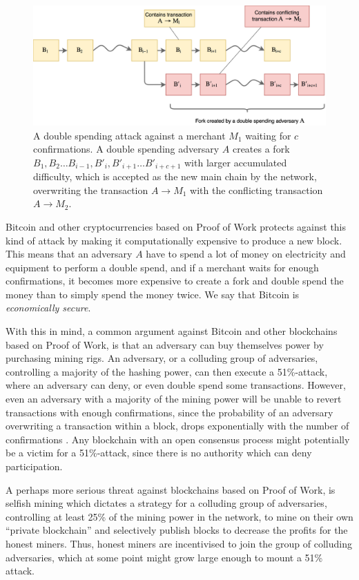 \documentclass{style/kththesis}
\begin{document}
\begin{figure}[ht!]
    \centering
    \includegraphics[width=\textwidth]{figures/double-spend}
    \caption{A double spending attack against a merchant $M_1$ waiting for $c$ confirmations. A double spending adversary $A$ creates a fork $B_1, B_2\ldots B_{i-1}, B'_{i}, B'_{i+1}\ldots B'_{i+c+1}$ with larger accumulated difficulty, which is accepted as the new main chain by the network, overwriting the transaction $A \rightarrow M_1$ with the conflicting transaction $A \rightarrow M_2$.}
    \label{fig:double-spend}
\end{figure}

Bitcoin and other cryptocurrencies based on Proof of Work protects against this kind of attack by making it computationally expensive to produce a new block. This means that an adversary $A$ have to spend a lot of money on electricity and equipment to perform a double spend, and if a merchant waits for enough confirmations, it becomes more expensive to create a fork and double spend the money than to simply spend the money twice. We say that Bitcoin is \emph{economically secure}.

With this in mind, a common argument against Bitcoin and other blockchains based on Proof of Work, is that an adversary can buy themselves power by purchasing mining rigs. An adversary, or a colluding group of adversaries, controlling a majority of the hashing power, can then execute a 51\%-attack, where an adversary can deny, or even double spend some transactions. However, even an adversary with a majority of the mining power will be unable to revert transactions with enough confirmations, since the probability of an adversary overwriting a transaction within a block, drops exponentially with the number of confirmations \cite{Nakamoto08}. Any blockchain with an open consensus process might potentially be a victim for a 51\%-attack, since there is no authority which can deny participation.

A perhaps more serious threat against blockchains based on Proof of Work, is selfish mining \cite{Eyal13} which dictates a strategy for a colluding group of adversaries, controlling at least 25\% of the mining power in the network, to mine on their own ``private blockchain'' and selectively publish blocks to decrease the profits for the honest miners. Thus, honest miners are incentivised to join the group of colluding adversaries, which at some point might grow large enough to mount a 51\% attack.
\end{document}
